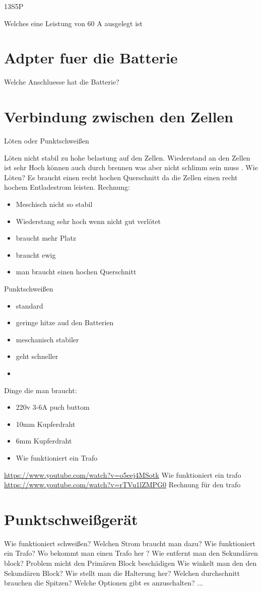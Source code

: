 13S5P 

Welches eine Leistung von 60 A ausgelegt ist 

\section{Adpter fuer die Batterie}
Welche Anschluesse hat die Batterie?




\section{Verbindung zwischen den Zellen}
Löten oder Punktschweißen

Löten nicht stabil zu hohe belastung auf den Zellen. Wiederstand an den Zellen ist sehr Hoch können auch durch brennen was aber nicht schlimm sein muss .
Wie Löten?
Es braucht einen recht hochen Querschnitt da die Zellen einen recht hochem Entladestrom leisten. Rechnung:
\begin{itemize}
    \item Meschisch nicht so stabil
    \item Wiederstang sehr hoch wenn nicht gut verlötet
    \item braucht mehr Platz
    \item braucht ewig
    \item man braucht einen hochen Querschnitt
\end{itemize}

Punktschweißen
\begin{itemize}
    \item standard
    \item geringe hitze aud den Batterien
    \item meschanisch stabiler
    \item geht schneller
    \item 
\end{itemize}
Dinge die man braucht:
\begin{itemize}
    \item 220v 3-6A puch buttom
    \item 10mm Kupferdraht
    \item 6mm Kupferdraht
    \item Wie funktioniert ein Trafo
\end{itemize}
\url{https://www.youtube.com/watch?v=o5eej4MSotk}
Wie funktioniert ein trafo
\url{https://www.youtube.com/watch?v=rTVu1lZMPG0}
Rechnung für den trafo

\section{Punktschweißgerät}
Wie funktioniert schweißen?
Welchen Strom braucht man dazu?
Wie funktioniert ein Trafo?
Wo bekommt man einen Trafo her ?
Wie entfernt man den Sekundären block?
Problem micht den Primären Block beschädigen
Wie winkelt man den den Sekundären Block?
Wie stellt man die Halterung her?
Welchen durchschnitt brauchen die Spitzen?
Welche Optionen gibt es anzuschalten?
...

